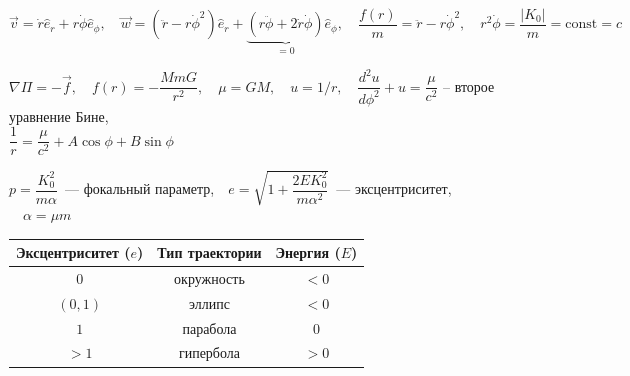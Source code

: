 \begin{itemize*}
  \item \(\vec{v} = \dot{r}\hat{e}_r + r\dot{\phi}\hat{e}_\phi, \quad \vec{w} = (\ddot{r} -
  r\dot{\phi}^2)\hat{e}_r + \underbrace{(r\ddot{\phi} + 2\dot{r}\dot{\phi})}_{= 0}\hat{e}_\phi,
  \quad \dfrac{f(r)}{m} = \ddot{r} - r\dot{\phi}^2, \quad r^2\dot{\phi} = \dfrac{|K_0|}{m} =
  \text{const} = c\) \\

  \item \(\nabla \Pi = -\vec{f}, \quad f(r) = -\dfrac{MmG}{r^2}, \quad \mu = GM, \quad u =
  1/r, \quad \dfrac{d^2 u}{d\phi^2} + u = \dfrac{\mu}{c^2}\) \--- второе уравнение Бине, \\
  \(\dfrac{1}{r} = \dfrac{\mu}{c^2} + A\cos{\phi} + B\sin{\phi}\) \\

  \item \(p = \dfrac{K_0^2}{m\alpha}\)~--- фокальный параметр,\(\quad e = \sqrt{1 +
  \dfrac{2EK^2_0}{m\alpha^2}}\)~--- эксцентриситет,\(\quad \alpha = \mu m\) \medskip \\

\item
  \begin{tabular}{|c|c|c|}
  \hline
  Эксцентриситет (\(e\)) & Тип траектории & Энергия (\(E\)) \\
  \hline
  \(0\)      & окружность& \(< 0\) \\
  \((0, 1)\) & эллипс    & \(< 0\) \\
  \(1\)      & парабола  & \(0\) \\
  \(> 1\)      & гипербола & \(> 0\) \\
  \hline
  \end{tabular}

\end{itemize*}


